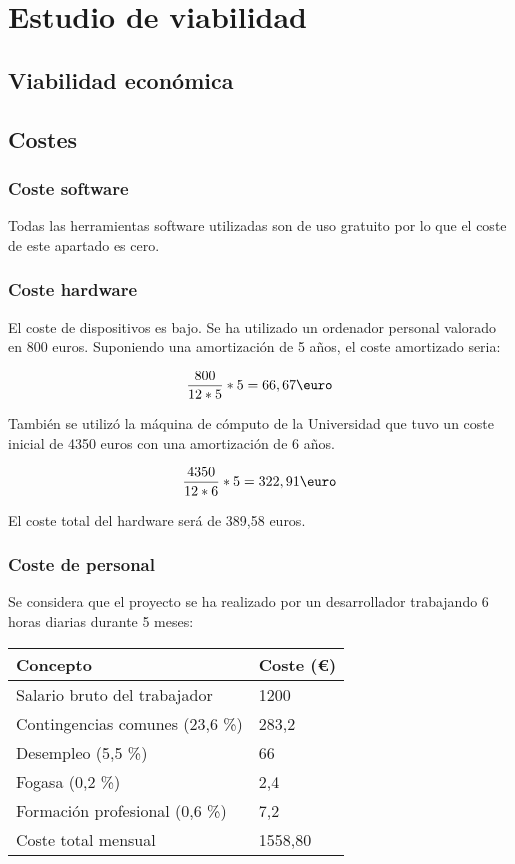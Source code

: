 \section{Estudio de viabilidad}

\subsection{Viabilidad económica}

\subsection{Costes}
\subsubsection{Coste software}
Todas las herramientas software utilizadas son de uso gratuito por lo que el coste de este apartado es cero.
\subsubsection{Coste hardware}
El coste de dispositivos es bajo. Se ha utilizado un ordenador personal valorado en 800 euros. Suponiendo una amortización de 5 años, el coste amortizado seria:

\begin{equation}
\frac{800}{12 * 5} * 5 = 66,67  \text{\euro}
\end{equation}

También se utilizó la máquina de cómputo de la Universidad que tuvo un coste inicial de 4350 euros con una amortización de 6 años.

\begin{equation}
\frac{4350}{12 * 6} * 5 = 322,91  \text{\euro}
\end{equation}

El coste total del hardware será de 389,58 euros.

\subsubsection{Coste de personal}

Se considera que el proyecto se ha realizado por un desarrollador trabajando 6 horas diarias durante 5 meses:


\begin{table}[H]
	\begin{center}
		\begin{tabular}{ll}
			\hline
			Concepto                        & Coste (€) \\ \hline
			Salario bruto del trabajador    & 1200      \\
			Contingencias comunes (23,6 \%) & 283,2     \\
			Desempleo (5,5 \%)              & 66        \\
			Fogasa (0,2 \%)                 & 2,4       \\
			Formación profesional (0,6 \%)  & 7,2       \\ \hline
			Coste total mensual             & 1558,80  
		\end{tabular}
	\end{center}
\end{table}


